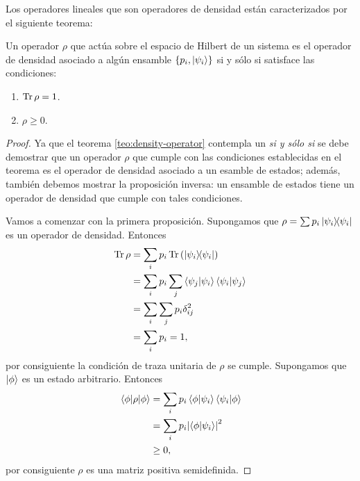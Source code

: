 Los operadores lineales que son operadores de densidad están 
caracterizados por el siguiente teorema:
\begin{teorema}
Un operador $\rho$  que actúa sobre el espacio de Hilbert de un sistema 
es el operador de densidad asociado a algún ensamble 
$\{p_i, \ket{\psi _i} \}$ si y sólo si satisface las condiciones:
\begin{enumerate}
\item $\Tr \rho = 1$.
\item $\rho \geq 0$.
\end{enumerate}	
\label{teo:density-operator}
\end{teorema}

\begin{proof}
	Ya que el teorema \ref{teo:density-operator} contempla un \textit{si
	y sólo si} se debe demostrar que un operador $\rho$ que cumple con 
	las condiciones establecidas en el teorema es el operador 
	de densidad asociado a un esamble de estados; además, también debemos
	mostrar la proposición inversa: un ensamble de estados
	tiene un operador de densidad que cumple con tales condiciones.
	
	Vamos a comenzar con la primera proposición. 
	Supongamos que $\rho = \sum p_i\dyad{\psii}{\psii}$ es un operador de
	densidad. Entonces 
	\begin{align*}
		\Tr \rho &= \sum _i p_i\Tr \qty(\dyad{\psii}{\psii})\\
		&= \sum _i p_i \sum _j \braket{\psi_j}{\psii}\braket{\psii}{\psi_j}\\
		&=\sum _i \sum _j p_i \delta _{ij}^2\\
		&=\sum _i p_i=1,
	\end{align*}
	por consiguiente la condición de traza unitaria de $\rho$ se cumple. 
	Supongamos que $\ket{\phi}$ es un estado arbitrario. Entonces
	\begin{align*}
		\matrixel{\phi}{\rho}{\phi} &= \sum _i p_i \braket{\phi}{\psii}
		\braket{\psii}{\phi} \\
		&=\sum _i p_i \abs{\braket{\phi}{\psii}}^2\\
		&\geq 0,
	\end{align*}
	por consiguiente $\rho$ es una matriz positiva semidefinida. 
 	

\end{proof}
